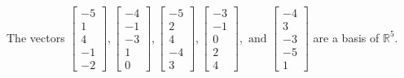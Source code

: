 \begin{exercise}
\begin{exerciseStatement}
  \end{exerciseStatement}
  \begin{exerciseAnswer}
   The vectors \(\left[\begin{array}{r}
-5 \\
1 \\
4 \\
-1 \\
-2
\end{array}\right] , \left[\begin{array}{r}
-4 \\
-1 \\
-3 \\
1 \\
0
\end{array}\right] , \left[\begin{array}{r}
-5 \\
2 \\
4 \\
-4 \\
3
\end{array}\right] , \left[\begin{array}{r}
-3 \\
-1 \\
0 \\
2 \\
4
\end{array}\right] , \text{ and } \left[\begin{array}{r}
-4 \\
3 \\
-3 \\
-5 \\
1
\end{array}\right]\) 
  	 are  a basis of \(\mathbb{R}^5\).
  


  \end{exerciseAnswer}
\end{exercise}
